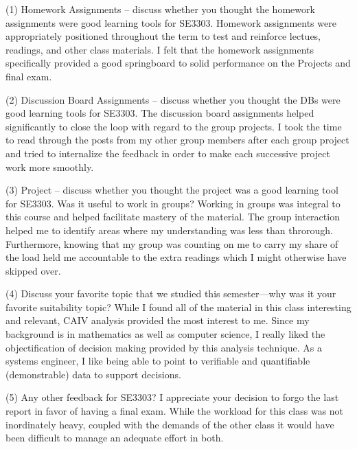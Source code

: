 (1) Homework Assignments – discuss whether you thought the homework assignments were good learning tools for SE3303.
Homework assignments were appropriately positioned throughout the term to test and reinforce lectues, readings, and other class materials.  I felt that the homework assignments specifically provided a good springboard to solid performance on the Projects and final exam.

(2) Discussion Board Assignments – discuss whether you thought the DBs were good learning tools for SE3303.  
The discussion board assignments helped significantly to close the loop with regard to the group projects.  I took the time to read through the posts from my other group members after each group project and tried to internalize the feedback in order to make each successive project work more smoothly.

(3) Project – discuss whether you thought the project was a good learning tool for SE3303. Was it useful to work in groups?
Working in groups was integral to this course and helped facilitate mastery of the material.  The group interaction helped me to identify areas where my understanding was less than throrough.  Furthermore, knowing that my group was counting on me to carry my share of the load held me accountable to the extra readings which I might otherwise have skipped over.

(4) Discuss your favorite topic that we studied this semester—why was it your favorite suitability topic?
While I found all of the material in this class interesting and relevant, CAIV analysis provided the most interest to me.  Since my background is in mathematics as well as computer science, I really liked the objectification of decision making provided by this analysis technique.  As a systems engineer, I like being able to point to verifiable and quantifiable (demonstrable) data to support decisions.

(5) Any other feedback for SE3303?
I appreciate your decision to forgo the last report in favor of having a final exam.  While the workload for this class was not inordinately heavy, coupled with the demands of the other class it would have been difficult to manage an adequate effort in both.
